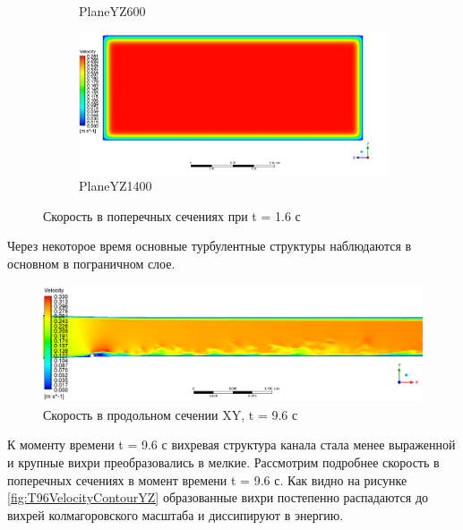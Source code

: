 \begin{figure}[H]
\begin{subfigure}{.5\textwidth}
			\caption{PlaneYZ600}
			\label{fig:T16VelocityContourYZ600}
		\end{subfigure}%
		\begin{subfigure}{.5\textwidth}
			\centering
			\includegraphics[width=1.1\linewidth]{../Assets/T16_Velocity_ContourYZ1400}
			\caption{PlaneYZ1400}
			\label{fig:T16VelocityContourYZ1400}
		\end{subfigure}
		\caption{Скорость в поперечных сечениях при t = 1.6 с}
		\label{fig:T16VelocityContourYZ}
	\end{figure}
	Через некоторое время основные турбулентные структуры наблюдаются в основном в пограничном слое.
	\begin{figure}[H]
		\centering
		\includegraphics[width=1\linewidth]{../Assets/T96_Velocity_ContourXY}
		\caption{Скорость в продольном сечении XY, t = 9.6 с}
		\label{fig:t96velocitycontourxy}
	\end{figure}
	К моменту времени t = 9.6 с вихревая структура канала стала менее выраженной и крупные вихри преобразовались в мелкие. 
	Рассмотрим подробнее скорость в поперечных сечениях в момент времени t = 9.6 с. Как видно на рисунке \ref{fig:T96VelocityContourYZ} образованные вихри постепенно распадаются до вихрей колмагоровского масштаба и диссипируют в энергию.
